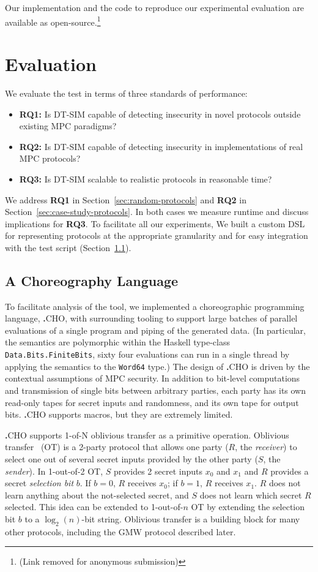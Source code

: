\documentclass[compsoc, conference, a4paper, 10pt, times]{IEEEtran}
\newcommand{\langname}{\textsc{\textbf{.}CHO}\xspace}
\newcommand{\toolname}{\textsc{DT-SIM}\xspace}
\begin{document}
Our implementation and the code to reproduce our experimental evaluation are available as open-source.\footnote{(Link removed for anonymous submission)}


\section{Evaluation}

We evaluate the test in terms of three standards of performance:
\begin{itemize}
\item \textbf{RQ1:} Is \toolname capable of detecting insecurity in novel protocols outside existing MPC paradigms?
\item \textbf{RQ2:} Is \toolname capable of detecting insecurity in implementations of real MPC protocols?
\item \textbf{RQ3:} Is \toolname scalable to realistic protocols in reasonable time?
\end{itemize}
We address \textbf{RQ1} in Section~\ref{sec:random-protocols}
and \textbf{RQ2} in Section~\ref{sec:case-study-protocols}.
In both cases we measure runtime and discuss implications for \textbf{RQ3}.
To facilitate all our experiments,
We built a custom DSL for representing protocols at the appropriate granularity and for easy integration with the test script
(Section~\ref{sec:cho-lang}).


\subsection{A Choreography Language}
\label{sec:cho-lang}

To facilitate analysis of the tool, we implemented a choreographic programming language, \langname,
with surrounding tooling to support large batches of parallel evaluations of a single program and piping of the generated data.
(In particular, the semantics are polymorphic within the Haskell type-class \texttt{Data.Bits.FiniteBits},
\eg{} sixty four evaluations can run in a single thread by applying the semantics to the \texttt{Word64} type.)
The design of \langname is driven by the contextual assumptions of MPC security.
In addition to bit-level computations and transmission of single bits between arbitrary parties,
each party has its own read-only tapes for secret inputs and randomness,
and its own tape for output bits.
\langname supports macros, but they are extremely limited.

\langname supports 1-of-N oblivious transfer as a primitive operation.
Oblivious transfer~\cite{todo} (OT) is a 2-party protocol that allows one party ($R$, the \emph{receiver}) to select one out of several secret inputs provided by the other party ($S$, the \emph{sender}). In 1-out-of-2 OT, $S$ provides 2 secret inputs $x_0$ and $x_1$ and $R$ provides a secret \emph{selection bit} $b$. If $b=0$, $R$ receives $x_0$; if $b=1$, $R$ receives $x_1$. $R$ does not learn anything about the not-selected secret, and $S$ does not learn which secret $R$ selected. This idea can be extended to 1-out-of-$n$ OT by extending the selection bit $b$ to a $\log_2(n)$-bit string.
%
Oblivious transfer is a building block for many other protocols, including the GMW protocol described later.
\end{document}
